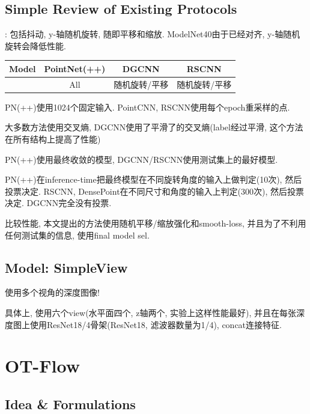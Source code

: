 \documentclass{article}
\begin{document}
\subsection{Simple Review of Existing Protocols}

\begin{flushleft}
    : 包括抖动, y-轴随机旋转, 随即平移和缩放. ModelNet40由于已经对齐, y-轴随机旋转会降低性能.
    \begin{tabular}{|c|c|c|c|}
        Model & PointNet(++) & DGCNN & RSCNN \\
        \hline
            & All & 随机旋转/平移 & 随机旋转/平移
    \end{tabular}

     PN(++)使用1024个固定输入. PointCNN, RSCNN使用每个epoch重采样的点.

     大多数方法使用交叉熵, DGCNN使用了平滑了的交叉熵(label经过平滑, 这个方法在所有结构上提高了性能)

     PN(++)使用最终收敛的模型, DGCNN/RSCNN使用测试集上的最好模型.

     PN(++)在inference-time把最终模型在不同旋转角度的输入上做判定(10次), 然后投票决定. RSCNN, DensePoint在不同尺寸和角度的输入上判定(300次), 然后投票决定. DGCNN完全没有投票.

    比较性能, 本文提出的方法使用随机平移/缩放强化和smooth-loss, 并且为了不利用任何测试集的信息, 使用final model sel.
\end{flushleft}

\subsection{Model: SimpleView}

\begin{flushleft}
    \begin{idea}
        使用多个视角的深度图像!
    \end{idea}

    具体上, 使用六个view(水平面四个, z轴两个, 实验上这样性能最好), 并且在每张深度图上使用ResNet18/4骨架(ResNet18, 滤波器数量为1/4), concat连接特征.
\end{flushleft}

\section{OT-Flow}

\subsection{Idea \& Formulations}
\end{document}
